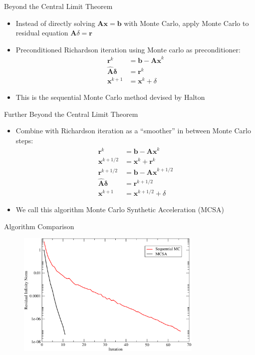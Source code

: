 \documentclass{beamer}
\begin{document}
\begin{frame}{Beyond the Central Limit Theorem}
  \begin{itemize}
    \item Instead of directly solving $\mathbf{Ax}=\mathbf{b}$ with Monte
      Carlo, apply Monte Carlo to residual equation
      $\mathbf{A}\delta = \mathbf{r}$
    \vfill
    \item Preconditioned Richardson iteration using Monte carlo as
      preconditioner:
      \begin{align*}
        \mathbf{r}^{k} &= \mathbf{b} - \mathbf{Ax}^{k} \\
        \hat{\mathbf{A}} \mathbf{\delta} &= \mathbf{r}^{k} \\
        \mathbf{x}^{k+1} &= \mathbf{x}^k + \delta
      \end{align*}
    \vfill
    \item This is the sequential Monte Carlo method devised by Halton
  \end{itemize}
\end{frame}
\begin{frame}{Further Beyond the Central Limit Theorem}
  \begin{itemize}
    \item Combine with Richardson iteration as a ``smoother'' in between
      Monte Carlo steps:
      \begin{align*}
        \mathbf{r}^k &= \mathbf{b} - \mathbf{Ax}^k \\
        \mathbf{x}^{k+1/2} &= \mathbf{x}^k + \mathbf{r}^k \\
        \mathbf{r}^{k+1/2} &= \mathbf{b} - \mathbf{Ax}^{k+1/2} \\
        \hat{\mathbf{A}} \mathbf{\delta} &= \mathbf{r}^{k+1/2} \\
        \mathbf{x}^{k+1} &= \mathbf{x}^{k+1/2} + \delta
      \end{align*}
    \vfill
    \item We call this algorithm Monte Carlo Synthetic Acceleration (MCSA)
  \end{itemize}
\end{frame}
\begin{frame}{Algorithm Comparison}
  \begin{figure}
    \includegraphics[width=3.5in]{seq_conv_100}
  \end{figure}
\end{frame}
\end{document}
